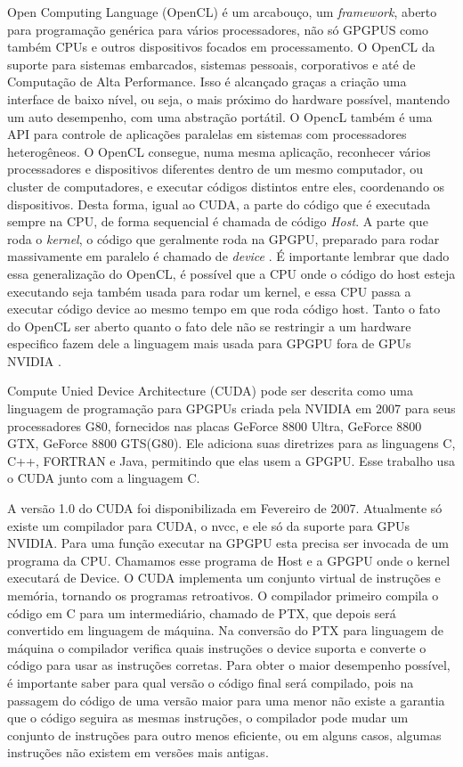   Open Computing Language (OpenCL) é um arcabouço, um \textit{framework}, aberto para programação genérica para vários processadores, não só GPGPUS como também CPUs e outros dispositivos focados em processamento. O OpenCL da suporte para sistemas embarcados, sistemas pessoais, corporativos e até de Computação de Alta Performance. Isso é alcançado graças a criação uma interface de baixo nível, ou seja, o mais próximo do hardware possível, mantendo um auto desempenho, com uma abstração portátil. O OpencL também é uma API para controle de aplicações paralelas em sistemas com processadores heterogêneos. O OpenCL consegue, numa mesma aplicação, reconhecer vários processadores e dispositivos diferentes dentro de um mesmo computador, ou cluster de computadores, e executar códigos distintos entre eles, coordenando os dispositivos. Desta forma, igual ao CUDA, a parte do código que é executada sempre na CPU, de forma sequencial é chamada de código \textit{Host}. A parte que roda o \textit{kernel}, o código que geralmente roda na GPGPU, preparado para rodar massivamente em paralelo é chamado de \textit{device} . É importante lembrar que dado essa generalização do OpenCL, é possível que a CPU onde o código do host esteja executando seja também usada para rodar um kernel, e essa CPU passa a executar código device ao mesmo tempo em que roda código host. Tanto o fato do OpenCL ser aberto quanto o fato dele não se restringir a um hardware especifico fazem dele a linguagem mais usada para GPGPU fora de GPUs NVIDIA \citep{EDOpencl:11}.

  Compute Unied Device Architecture (CUDA) pode ser descrita como uma linguagem de programação para GPGPUs criada pela NVIDIA em 2007 para seus processadores G80, fornecidos nas placas GeForce 8800 Ultra, GeForce 8800 GTX, GeForce 8800 GTS(G80). Ele adiciona suas diretrizes para as linguagens C, C++, FORTRAN e Java, permitindo que elas usem a GPGPU. Esse trabalho usa o CUDA junto com a linguagem C.

  A versão 1.0 do CUDA foi disponibilizada em Fevereiro de 2007. Atualmente só existe um compilador para CUDA, o nvcc, e ele só da suporte para GPUs NVIDIA. Para uma função executar na GPGPU esta precisa ser invocada de um programa da CPU. Chamamos esse programa de Host e a GPGPU onde o kernel executará de Device. O CUDA implementa um conjunto virtual de instruções e memória, tornando os programas retroativos. O compilador primeiro compila o código em C para um intermediário, chamado de PTX, que depois será convertido em linguagem de máquina. Na conversão do PTX para linguagem de máquina o compilador verifica quais instruções o device suporta e converte o código para usar as instruções corretas. Para obter o maior desempenho possível, é importante saber para qual versão o código final será compilado, pois na passagem do código de uma versão maior para uma menor não existe a garantia que o código seguira as mesmas instruções, o compilador pode mudar um conjunto de instruções para outro menos eficiente, ou em alguns casos, algumas instruções não existem em versões mais antigas.

